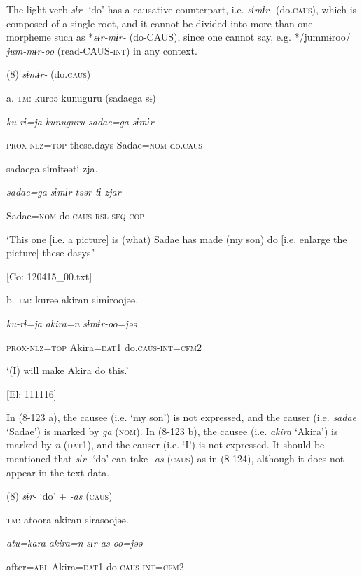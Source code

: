   The light verb \textit{sɨr-} ‘do’ has a causative counterpart, i.e. \textit{sɨmɨr-} (do.\textsc{caus}), which is composed of a single root, and it cannot be divided into more than one morpheme such as *\textit{sɨr-mɨr-} (do-CAUS), since one cannot say, e.g. */jummɨroo/ \textit{jum-mɨr-oo} (read-CAUS-\textsc{int}) in any context.

(8)  \textit{sɨmɨr-} (do.\textsc{caus})

  a.  \textsc{tm}:  kurəə  kunuguru  (sadaega  sɨ)

      \textit{ku-rɨ=ja}  \textit{kunuguru}  \textit{sadae=ga}  \textit{sɨmɨr}

      \textsc{prox}-\textsc{nlz}=\textsc{top}  these.days  Sadae=\textsc{nom}  do.\textsc{caus}

      sadaega  sɨmɨtəətɨ  zja.

      \textit{sadae=ga}  \textit{sɨmɨr{}-təər-tɨ  zjar}

      Sadae=\textsc{nom}  do.\textsc{caus}-\textsc{rsl}-\textsc{seq}  \textsc{cop}

      ‘This one [i.e. a picture] is (what) Sadae has made (my son) do [i.e. enlarge the picture] these dasys.’

      [Co: 120415\_00.txt]

  b.  \textsc{tm}:  kurəə  akiran  sɨmɨroojəə.

      \textit{ku-rɨ=ja}  \textit{akira=n}  \textit{sɨmɨr{}-oo=jəə}

      \textsc{prox}-\textsc{nlz}=\textsc{top}  Akira=\textsc{dat}1  do.\textsc{caus}-\textsc{int}=\textsc{cfm}2

      ‘(I) will make Akira do this.’

      [El: 111116]

In (8-123 a), the causee (i.e. ‘my son’) is not expressed, and the causer (i.e. \textit{sadae} ‘Sadae’) is marked by \textit{ga} (\textsc{nom}). In (8-123 b), the causee (i.e. \textit{akira} ‘Akira’) is marked by \textit{n} (\textsc{dat}1), and the causer (i.e. ‘I’) is not expressed. It should be mentioned that \textit{sɨr-} ‘do’ can take \textit{-as} (\textsc{caus}) as in (8-124), although it does not appear in the text data.

(8)  \textit{sɨr-} ‘do’ + \textit{{}-as} (\textsc{caus})

  \textsc{tm}:  atoora  akiran  sɨrasoojəə.

    \textit{atu=kara}  \textit{akira=n}  \textit{sɨr-as{}-oo=jəə}

    after=\textsc{abl}  Akira=\textsc{dat}1  do-\textsc{caus}-\textsc{int}=\textsc{cfm}2

